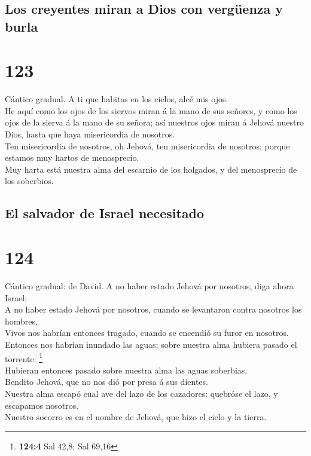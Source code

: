 \hypertarget{los-creyentes-miran-a-dios-con-verguxfcenza-y-burla}{%
\subsection{Los creyentes miran a Dios con vergüenza y
burla}\label{los-creyentes-miran-a-dios-con-verguxfcenza-y-burla}}

\hypertarget{section-122}{%
\section{123}\label{section-122}}

 Cántico gradual. A ti que habitas en los cielos, alcé mis
ojos.\\
 He aquí como los ojos de los siervos miran á la mano de sus
señores, y como los ojos de la sierva á la mano de su señora; así
nuestros ojos miran á Jehová nuestro Dios, hasta que haya misericordia
de nosotros.\\
 Ten misericordia de nosotros, oh Jehová, ten misericordia
de nosotros; porque estamos muy hartos de menosprecio.\\
 Muy harta está nuestra alma del escarnio de los holgados, y
del menosprecio de los soberbios.

\hypertarget{el-salvador-de-israel-necesitado}{%
\subsection{El salvador de Israel
necesitado}\label{el-salvador-de-israel-necesitado}}

\hypertarget{section-123}{%
\section{124}\label{section-123}}

 Cántico gradual: de David. A no haber estado Jehová por
nosotros, diga ahora Israel;\\
 A no haber estado Jehová por nosotros, cuando se levantaron
contra nosotros los hombres,\\
 Vivos nos habrían entonces tragado, cuando se encendió su
furor en nosotros.\\
 Entonces nos habrían inundado las aguas; sobre nuestra alma
hubiera pasado el torrente: \footnote{\textbf{124:4} Sal 42,8; Sal 69,16}\\
 Hubieran entonces pasado sobre nuestra alma las aguas
soberbias.\\
 Bendito Jehová, que no nos dió por presa á sus dientes.\\
 Nuestra alma escapó cual ave del lazo de los cazadores:
quebróse el lazo, y escapamos nosotros.\\
 Nuestro socorro es en el nombre de Jehová, que hizo el
cielo y la tierra.

